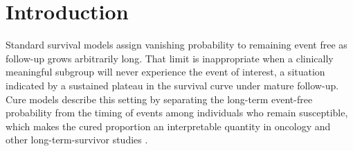 \section{Introduction}\label{sec:introduction}

Standard survival models assign vanishing probability to remaining event
free as follow-up grows arbitrarily long. That limit is inappropriate
when a clinically meaningful subgroup will never experience the event of
interest, a situation indicated by a sustained plateau in the survival
curve under mature follow-up. Cure models describe this setting by
separating the long-term event-free probability from the timing of
events among individuals who remain susceptible, which makes the cured
proportion an interpretable quantity in oncology and other long-term-survivor
studies \cite{berkson1952,tsodikov2003}.

